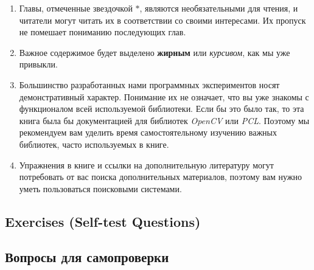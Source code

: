 \begin{Russian}
\begin{enumerate}
    	\item Главы, отмеченные звездочкой \(*\), являются необязательными для чтения, и читатели могут читать их в соответствии со своими интересами. Их пропуск не помешает пониманию последующих глав.
    
    	\item Важное содержимое будет выделено \textbf{жирным} или \emph{курсивом}, как мы уже привыкли.
    
    	\item Большинство разработанных нами программных экспериментов носят демонстративный характер. Понимание их не означает, что вы уже знакомы с функционалом всей используемой библиотеки. Если бы это было так, то эта книга была бы документацией для библиотек \textit{OpenCV} или \textit{PCL}. Поэтому мы рекомендуем вам уделить время самостоятельному изучению важных библиотек, часто используемых в книге.
    
    	\item Упражнения в книге и ссылки на дополнительную литературу могут потребовать от вас поиска дополнительных материалов, поэтому вам нужно уметь пользоваться поисковыми системами.
    \end{enumerate}
\end{Russian}

\begin{English}
    \section*{Exercises (Self-test Questions)}
\end{English}

\begin{Russian}
    \section*{Вопросы для самопроверки}
\end{Russian}

